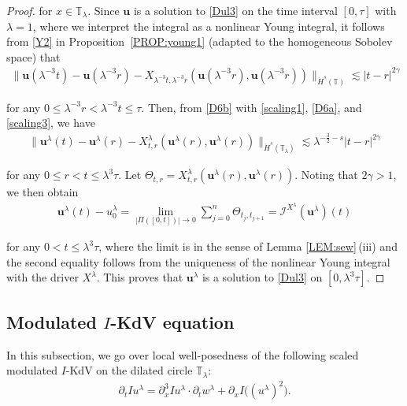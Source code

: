 \documentclass[letterpaper, 11pt,  reqno]{amsart}
\newcommand{\1}{\hspace{0.5mm}\text{I}\hspace{0.5mm}}
\newcommand{\I}{\mathcal{I}}
\newcommand{\noi}{\noindent}
\newcommand{\T}{\mathbb{T}}
\newcommand{\g}{\gamma}
\newcommand{\ld}{\lambda}
\newcommand{\dx}{\partial_x}
\newcommand{\dt}{\partial_t}
\newcommand{\les}{\lesssim}
\newcommand{\uu}{\mathbf{u}}
\newcommand{\Ta}{\Theta}
\numberwithin{equation}{section}
\numberwithin{theorem}{section}
\begin{document}
\begin{proof}
\noi
for $x \in \T_\ld$.
Since $\uu$ is a solution to \eqref{Dul3} 
on the time interval $[0, \tau]$
with $\ld = 1$, 
where we interpret
 the integral as a nonlinear Young integral, 
it follows from \eqref{Y2} in Proposition~\ref{PROP:young1} 
(adapted to the homogeneous Sobolev space) that 
\begin{align}
\| \uu(\ld^{-3}t) - \uu(\ld^{-3}r) 
- X_{\ld^{-3}t, \ld^{-3}r} ( \uu(\ld^{-3}r ) , \uu(\ld^{-3}r))  \|_{\dot H^s(\T)}
\les  |t-r|^{2\g}
\label{D6b}
\end{align}


\noi
for any $0\leq \ld^{-3}r<\ld^{-3}t\leq \tau$.
Then, from \eqref{D6b} with 
\eqref{scaling1}, \eqref{D6a}, and 
\eqref{scaling3}, we have
\begin{align*}
\|\uu^\ld(t) - \uu^\ld(r) - X^\ld_{t,r} (\uu^\ld(r), \uu^\ld (r))\|_{\dot H^s(\T_{\ld})}
\les \ld^{-\frac{3}{2}-s} |t-r|^{2\g}
\end{align*}


\noi
for any $0 \le r < t \le \ld^3 \tau$.
Let  $\Ta_{t, r} = X^\ld_{t,r} (\uu^\ld(r), \uu^\ld (r))$.
Noting that  $2\g > 1$, 
we then obtain 
\begin{align*}
\uu^\ld (t) - u_0^\ld  = \lim_{|\Pi([0,t])|\to 0} 
\sum^n_{j=0} \Theta_{t_j,t_{j+1}}
= \I^{X^\ld}(\uu^\ld)(t) 
\end{align*} 
 
 \noi
for any $0 < t \le \ld^3 \tau$,   where 
 the limit is in the sense of Lemma \ref{LEM:sew}\,(iii)
 and the second equality follows from the uniqueness
 of the nonlinear Young integral with the driver $X^\ld$.
This proves that 
 $\uu^\ld$ is a solution to \eqref{Dul3}
on $[0, \ld^3\tau]$.
\end{proof}






\subsection{Modulated $I$-KdV equation}
\label{SUBSEC:I2}

In this subsection, we go over  local well-posedness
of the following scaled modulated $I$-KdV
on the dilated circle $\T_\ld$:
\begin{align}
\dt I u^{\ld} =    \dx^3 I u^{\ld}
\cdot \dt  w^{\ld}
  +\partial_x I\big((u^{\ld} )^2\big). 
\label{kdv4}
\end{align}
\end{document}
